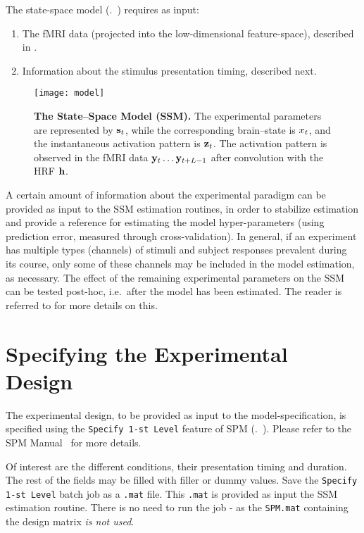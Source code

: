 
The state-space model (\cf.~) requires as input:
\begin{enumerate}
  \item The fMRI data (projected into the low-dimensional
  feature-space), described in .
  \item Information about the stimulus presentation timing,
  described next.
\end{enumerate}

\begin{figure}
\centering
\texttt{[image: model]}
    \caption[The State--Space Model (SSM)]{\textbf{The State--Space Model (SSM).
    } The experimental parameters are represented by ${\mathbf{s}}_t$,
    while the corresponding brain--state is ${x}_t$, and
    the instantaneous activation pattern is ${\mathbf{z}}_t$.
    The activation pattern is observed in the fMRI data ${\mathbf{y}}_t\ldots
    {\mathbf{y}}_{t+L-1}$  after convolution with the HRF ${\mathbf{h}}$.
    \label{fig:model}
    }
\end{figure}


A certain amount of information about the experimental paradigm can
be provided as input to the SSM estimation routines, in order to
stabilize estimation and provide a reference for estimating the
model hyper-parameters (using prediction error, measured through
cross-validation). In general, if an experiment has multiple types
(channels) of stimuli and subject responses prevalent during its
course, only some of these channels may be included in the model
estimation, as necessary. The effect of the remaining experimental
parameters on the SSM can be tested post-hoc, i.e.~after the model
has been estimated. The reader is referred to
\cite{Janoos2010g,Janoos2011} for more details on this.

\section{Specifying the Experimental Design}
\label{sec:specify}
The experimental design, to be provided as input to the
model-specification, is specified using the \verb"Specify 1-st Level"
feature of SPM (\cf.~\Fig ). Please refer to the SPM
Manual~\cite{TheFILMethodsGroup2011} for more details.

Of interest are the different conditions, their presentation timing
and duration. The rest of the fields may be filled with filler or
dummy values. Save the \verb"Specify 1-st Level" batch job as a
\verb".mat" file. This \verb".mat" is provided as input the SSM
estimation routine. There is no need to run the job - as the
\verb"SPM.mat" containing the design matrix \emph{is not used}.

